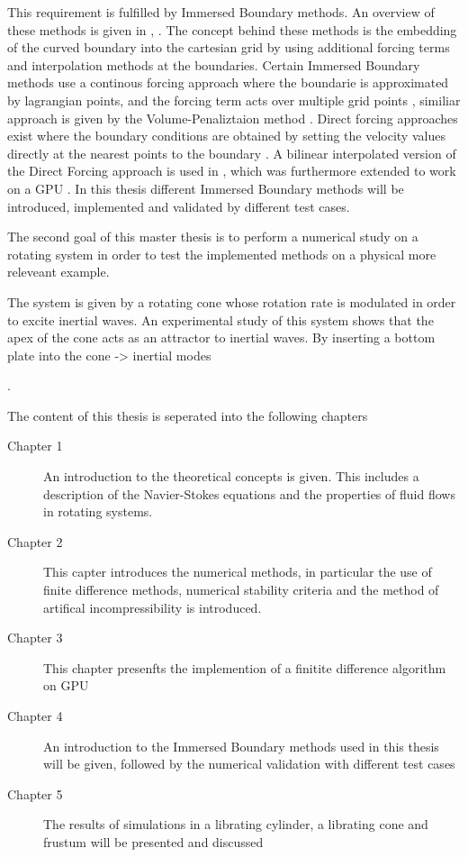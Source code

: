This requirement is fulfilled by Immersed Boundary methods.
An overview of these methods is given in \citep{Mittal2005}, \citep{Gornak2013}.
The concept behind these methods is the embedding of the curved boundary into the cartesian grid
by using additional forcing terms and interpolation methods at the boundaries.
Certain Immersed Boundary methods use a continous forcing approach where the boundarie is approximated by lagrangian points,
and the forcing term acts over multiple grid points \citep{Mittal2005},
similiar approach is given by the Volume-Penaliztaion method \citep{Lulff2011}.
Direct forcing approaches exist where the boundary conditions are obtained by setting the
velocity values directly at the nearest points to the boundary \citep{Fadlun2000}.
A bilinear interpolated version of the Direct Forcing approach is used in \citep{Gornak2013},
which was furthermore extended to work on a GPU \citep{DeLeon2012}.
In this thesis different Immersed Boundary methods will be introduced, implemented and
validated by different test cases.

\bigbreak

The second goal of this master thesis is to perform a numerical study on a rotating system in order
to test the implemented methods on a physical more releveant example.

The system is given by a rotating cone whose rotation rate is modulated in order to excite inertial waves.
An experimental study of this system shows that the apex of the cone acts as an attractor to inertial waves.
By inserting a bottom plate into the cone  -> inertial modes

\citep{Beardsley1970}.


\bigbreak

The content of this thesis is seperated into the following chapters
\begin{description}
\item[Chapter 1] An introduction to the theoretical concepts is given.  This includes a description of the Navier-Stokes equations
                    and the properties of fluid flows in rotating systems.
\item[Chapter 2] This capter introduces the numerical methods, in particular the use of finite difference methods,
                    numerical stability criteria and the method of artifical incompressibility is introduced.
\item[Chapter 3] This chapter presenfts the implemention of a finitite difference  algorithm on GPU

\item[Chapter 4] An introduction to  the Immersed Boundary methods used in this thesis will be given, followed by
                 the numerical validation with different test cases

\item[Chapter 5] The results of simulations in a librating cylinder, a librating cone and frustum will be presented and discussed
\end{description}

